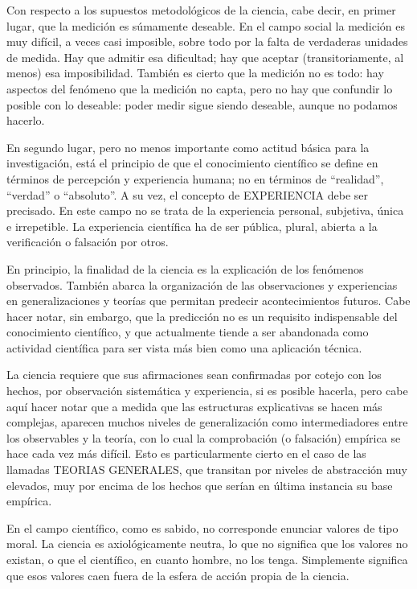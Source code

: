 \documentclass[
]{book}
\begin{document}
Con respecto a los supuestos metodológicos de la ciencia, cabe decir, en primer lugar, que la medición es súmamente deseable. En el campo social la medición es muy difícil, a veces casi imposible, sobre todo por la falta de verdaderas unidades de medida. Hay que admitir esa dificultad; hay que aceptar (transitoriamente, al menos) esa imposibilidad. También es cierto que la medición no es todo: hay aspectos del fenómeno que la medición no capta, pero no hay que confundir lo posible con lo deseable: poder medir sigue siendo deseable, aunque no podamos hacerlo.

En segundo lugar, pero no menos importante como actitud básica para la investigación, está el principio de que el conocimiento científico se define en términos de percepción y experiencia humana; no en términos de ``realidad'', ``verdad'' o ``absoluto''. A su vez, el concepto de EXPERIENCIA debe ser precisado. En este campo no se trata de la experiencia personal, subjetiva, única e irrepetible. La experiencia científica ha de ser pública, plural, abierta a la verificación o falsación por otros.

En principio, la finalidad de la ciencia es la explicación de los fenómenos observados. También abarca la organización de las observaciones y experiencias en generalizaciones y teorías que permitan predecir acontecimientos futuros. Cabe hacer notar, sin embargo, que la predicción no es un requisito indispensable del conocimiento científico, y que actualmente tiende a ser abandonada como actividad científica para ser vista más bien como una aplicación técnica.

La ciencia requiere que sus afirmaciones sean confirmadas por cotejo con los hechos, por observación sistemática y experiencia, si es posible hacerla, pero cabe aquí hacer notar que a medida que las estructuras explicativas se hacen más complejas, aparecen muchos niveles de generalización como intermediadores entre los observables y la teoría, con lo cual la comprobación (o falsación) empírica se hace cada vez más difícil. Esto es particularmente cierto en el caso de las llamadas TEORIAS GENERALES, que transitan por niveles de abstracción muy elevados, muy por encima de los hechos que serían en última instancia su base empírica.

En el campo científico, como es sabido, no corresponde enunciar valores de tipo moral. La ciencia es axiológicamente neutra, lo que no significa que los valores no existan, o que el científico, en cuanto hombre, no los tenga. Simplemente significa que esos valores caen fuera de la esfera de acción propia de la ciencia.
\end{document}
